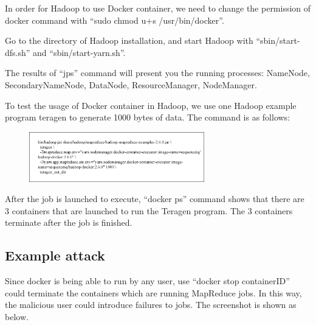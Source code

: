 In order for Hadoop to use Docker container, we need to change the permission of docker command with “sudo chmod u+s /usr/bin/docker”.

Go to the directory of Hadoop installation, and start Hadoop with “sbin/start-dfs.sh” and “sbin/start-yarn.sh”. 

The results of  “jps” command will present you the running processes: NameNode, SecondaryNameNode, DataNode, ResourceManager, NodeManager.

To test the usage of Docker container in Hadoop, we use one Hadoop example program teragen to generate 1000 bytes of data. The command is as follows:

\begin{figure}[h]
  \centering
  \includegraphics[width=3in]{figs/command.eps}
  \label{fig:overview}
\end{figure}

After the job is launched to execute, “docker ps” command shows that there are 3 containers that are launched to run the Teragen program. The 3 containers terminate after the job is finished.

\subsection{Example attack}

Since docker is being able to run by any user, use “docker stop containerID” could terminate the containers which are running MapReduce jobs. In this way, the malicious user could introduce failures to jobs. The screenshot is shown as below.